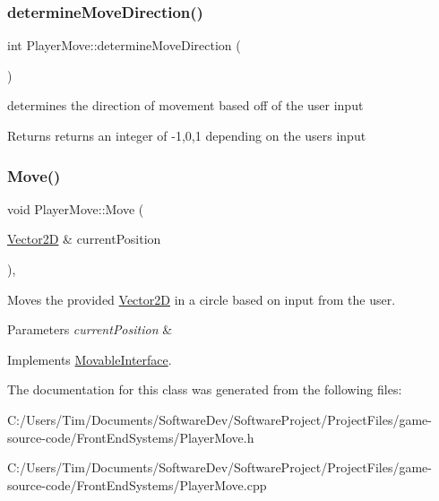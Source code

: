 \subsubsection{\texorpdfstring{determine\+Move\+Direction()}{determineMoveDirection()}}
{\footnotesize\ttfamily int Player\+Move\+::determine\+Move\+Direction (\begin{DoxyParamCaption}{ }\end{DoxyParamCaption})\hspace{0.3cm}{\ttfamily [private]}}



determines the direction of movement based off of the user input 

\begin{DoxyReturn}{Returns}
returns an integer of -\/1,0,1 depending on the users input 
\end{DoxyReturn}
\mbox{\label{class_player_move_a1c39885d4126c63441250eae23ac718a}} 
\subsubsection{\texorpdfstring{Move()}{Move()}}
{\footnotesize\ttfamily void Player\+Move\+::\+Move (\begin{DoxyParamCaption}\item[{\hyperlink{class_vector2_d}{Vector2D} \&}]{current\+Position }\end{DoxyParamCaption})\hspace{0.3cm}{\ttfamily [override]}, {\ttfamily [virtual]}}



Moves the provided \hyperlink{class_vector2_d}{Vector2D} in a circle based on input from the user. 


\begin{DoxyParams}{Parameters}
{\em current\+Position} & \\
\hline
\end{DoxyParams}


Implements \hyperlink{class_movable_interface_a899cc1c78eacbee13b906c6770e7f025}{Movable\+Interface}.



The documentation for this class was generated from the following files\+:\begin{DoxyCompactItemize}
\item 
C\+:/\+Users/\+Tim/\+Documents/\+Software\+Dev/\+Software\+Project/\+Project\+Files/game-\/source-\/code/\+Front\+End\+Systems/Player\+Move.\+h\item 
C\+:/\+Users/\+Tim/\+Documents/\+Software\+Dev/\+Software\+Project/\+Project\+Files/game-\/source-\/code/\+Front\+End\+Systems/Player\+Move.\+cpp\end{DoxyCompactItemize}
